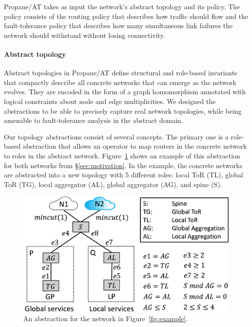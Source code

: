 \documentclass[numbers, 10pt, preprint]{sigplanconf}
\newcommand{\sysname}{{\text{}\small \sf Propane/AT}\xspace}
\newcommand{\para}[1]{\paragraph*{\textbf{#1}}}
\begin{document}

\sysname takes as input the network's abstract topology and its policy. The policy consists of the routing policy that describes how traffic should flow and the fault-tolerance policy that describes how many simultaneous link failures the network should withstand without losing connectivity.

\para{Abstract topology}
Abstract topologies in \sysname define structural and role-based invariants that compactly describe all concrete networks that can emerge as the network evolves. They are encoded in the form of a graph homomorphism annotated with logical constraints about node and edge multiplicities.
%
We designed the abstractions to be able to precisely capture real network topologies, while being amenable to fault-tolerance analysis in the abstract domain.


Our topology abstractions consist of several concepts.
The primary one is a role-based abstraction that allows an operator to map routers in the concrete network to roles in the abstract network. Figure~\ref{fig:example3} shows an example of this abstraction for both networks from \S\ref{sec:motivation}. In the example, the concrete networks are abstracted into a new topology with 5 different roles: local ToR (TL), global ToR (TG), local aggregator (AL), global aggregator (AG), and spine (S).

\begin{figure}[t!]
  \centering
  \includegraphics[width=\columnwidth]{figures/example3}
  \vspace{-1.3em}
  \caption{An abstraction for the network in Figure~\ref{fig:example}.}
  \label{fig:example3}
  \vspace{-.6em}
\end{figure}
\end{document}
